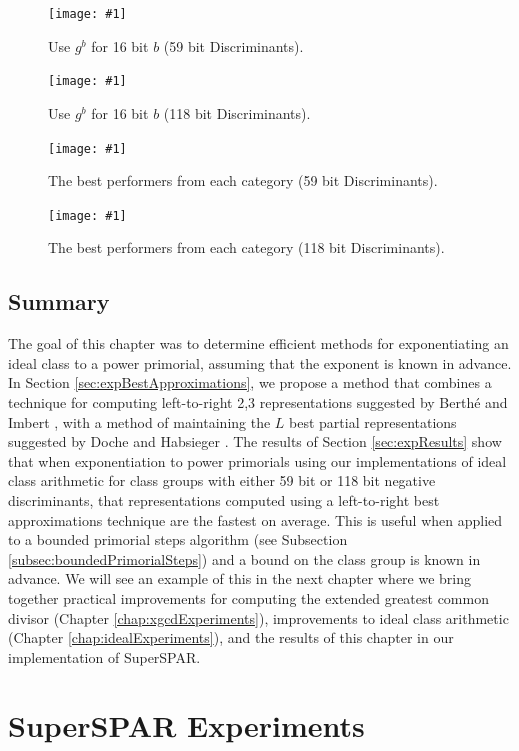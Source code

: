 \documentclass{ucalgthes1}
\theoremstyle{definition}
\newcommand{\mygraph}[3]{
	\begin{figure}[htb]
	\centering
	\texttt{[image: \#1]}
	\caption{#3}
	\label{#2}
	\end{figure}
}
\begin{document}
\mygraph{block_vs_list-64}{fig:expBlockList64}{Use $g^b$ for 16 bit $b$ (59 bit Discriminants).}
\mygraph{block_vs_list-128}{fig:expBlockList128}{Use $g^b$ for 16 bit $b$ (118 bit Discriminants).}

\mygraph{winners-64}{fig:expWinners64}{The best performers from each category (59 bit Discriminants).}
\mygraph{winners-128}{fig:expWinners128}{The best performers from each category (118 bit Discriminants).}

\clearpage


\section{Summary}

The goal of this chapter was to determine efficient methods for exponentiating an ideal class to a power primorial, assuming that the exponent is known in advance.  In Section \ref{sec:expBestApproximations}, we propose a method that combines a technique for computing left-to-right 2,3 representations suggested by Berth{\'e} and Imbert \cite{Berthe2009}, with a method of maintaining the $L$ best partial representations suggested by Doche and Habsieger \cite{Doche2008}.  The results of Section \ref{sec:expResults} show that when exponentiation to power primorials using our implementations of ideal class arithmetic for class groups with either 59 bit or 118 bit negative discriminants, that representations computed using a left-to-right best approximations technique are the fastest on average.  This is useful when applied to a bounded primorial steps algorithm (see Subsection \ref{subsec:boundedPrimorialSteps}) and a bound on the class group is known in advance.  We will see an example of this in the next chapter where we bring together practical improvements for computing the extended greatest common divisor (Chapter \ref{chap:xgcdExperiments}), improvements to ideal class arithmetic (Chapter \ref{chap:idealExperiments}), and the results of this chapter in our implementation of SuperSPAR.


\chapter{SuperSPAR Experiments}
\label{chap:ssparExperiments}
\end{document}
